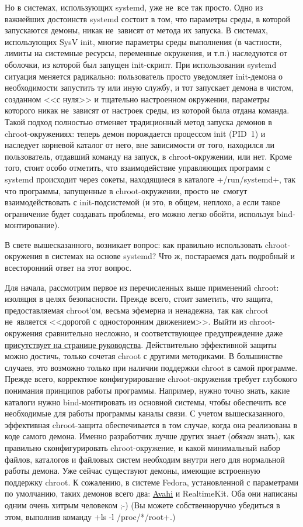 \documentclass[10pt,oneside,a4paper]{article}
\begin{document}
Но в системах, использующих systemd, уже не~все так просто. Одно из важнейших
достоинств systemd состоит в том, что параметры среды, в которой запускаются
демоны, никак не~зависят от метода их запуска. В системах, использующих SysV
init, многие параметры среды выполнения (в частности, лимиты на системные
ресурсы, переменные окружения, и т.п.) наследуются от оболочки, из которой был
запущен init-скрипт. При использовании systemd ситуация меняется радикально:
пользователь просто уведомляет init-демона о необходимости запустить ту или иную
службу, и тот запускает демона в чистом, созданном <<с нуля>> и тщательно
настроенном окружении, параметры которого никак не~зависят от настроек среды, из
которой была отдана команда. Такой подход полностью отменяет традиционный метод
запуска демонов в chroot-окружениях: теперь демон порождается процессом init
(PID~1) и наследует корневой каталог от него, вне зависимости от того, находился
ли пользователь, отдавший команду на запуск, в chroot-окружении, или нет. Кроме
того, стоит особо отметить, что взаимодействие управляющих программ с systemd
происходит через сокеты, находящиеся в каталоге +/run/systemd+, так что
программы, запущенные в chroot-окружении, просто не~смогут взаимодействовать с
init-подсистемой (и это, в общем, неплохо, а если такое ограничение будет
создавать проблемы, его можно легко обойти, используя bind-монтирование).

В свете вышесказанного, возникает вопрос: как правильно использовать
chroot-окружения в системах на основе systemd? Что ж, постараемся дать подробный
и всесторонний ответ на этот вопрос.

Для начала, рассмотрим первое из перечисленных выше применений chroot: изоляция
в целях безопасности. Прежде всего, стоит заметить, что защита, предоставляемая
chroot'ом, весьма эфемерна и ненадежна, так как chroot не~является <<дорогой с
односторонним движением>>. Выйти из chroot-окружения сравнительно несложно, и
соответствующее предупреждение даже
\href{http://linux.die.net/man/2/chroot}{присутствует на странице руководства}.
Действительно эффективной защиты можно достичь, только сочетая chroot с другими
методиками. В большинстве случаев, это возможно только при наличии поддержки
chroot в самой программе. Прежде всего, корректное конфигурирование
chroot-окружения требует глубокого понимания принципов работы программы.
Например, нужно точно знать, какие каталоги нужно bind-монтировать из основной
системы, чтобы обеспечить все необходимые для работы программы каналы связи.  С
учетом вышесказанного, эффективная chroot-защита обеспечивается в том случае,
когда она реализована в коде самого демона. Именно разработчик лучше других
знает (\emph{обязан} знать), как правильно сконфигурировать chroot-окружение, и
какой минимальный набор файлов, каталогов и файловых систем необходим внутри
него для нормальной работы демона. Уже сейчас существуют демоны, имеющие
встроенную поддержку chroot.  К сожалению, в системе Fedora, установленной с
параметрами по умолчанию, таких демонов всего два:
\href{http://avahi.org/}{Avahi} и RealtimeKit. Оба они написаны одним очень
хитрым человеком ;-) (Вы можете собственноручно убедиться в этом, выполнив
команду +ls -l /proc/*/root+.)
\end{document}

